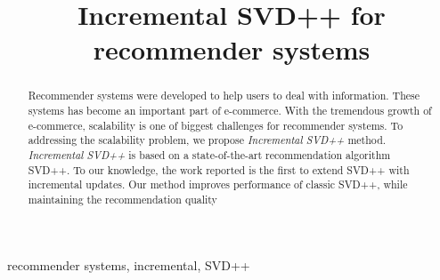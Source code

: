 \documentclass[conference]{IEEEtran}
\begin{document}
\title{Incremental SVD++ for recommender systems}

\author
{
\and
{}
}


\maketitle
\begin{abstract}
Recommender systems were developed to help users to deal with information. These systems has become an important part of e-commerce. With the tremendous growth of e-commerce, scalability is one of biggest challenges for recommender systems. To addressing the scalability problem, we propose \textit{Incremental SVD++} method. \textit{Incremental SVD++} is based on a state-of-the-art recommendation algorithm SVD++. To our knowledge, the work reported is the first to extend SVD++ with incremental updates. Our method improves performance of classic SVD++, while maintaining the recommendation quality
\end{abstract}


\begin{IEEEkeywords}
recommender systems, incremental, SVD++ 
\end{IEEEkeywords}

\IEEEpeerreviewmaketitle
\end{document}
